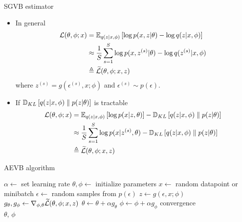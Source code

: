 \documentclass[unicode,11pt]{beamer}
\begin{document}
\begin{frame}{SGVB estimator}
  \begin{itemize}
  \item In general
    \begin{align*}
      \mathcal{L}(\theta, \phi; x)
      &= \E{q(z|x, \phi)}{\log p(x, z|\theta) - \log q(z|x, \phi)} \\
      &\approx \frac{1}{S} \sum\limits_{s = 1}^S
            \log p(x, z^{(s)}|\theta) - \log q(z^{(s)}|x, \phi) \\
      &\triangleq \widetilde{\mathcal{L}}(\theta, \phi; x, z)
    \end{align*}
    where $z^{(s)} = g(\epsilon^{(s)}, x; \phi)$ and $\epsilon^{(s)} \sim p(\epsilon)$.
  \item If $\mathbb{D}_{KL}\left[ q(z|x, \phi) \parallel p(z|\theta) \right]$ is tractable
    \begin{align*}
      \mathcal{L}(\theta, \phi; x)
      &= \E{q(z|x, \phi)}{\log p(x|z, \theta)} - \KL{q(z|x, \phi)}{p(z|\theta)} \\
      &\approx \frac{1}{S} \sum\limits_{s = 1}^S \log p(x|z^{(s)}, \theta)
       - \KL{q(z|x, \phi)}{p(z|\theta)} \\
      &\triangleq \widetilde{\mathcal{L}}(\theta, \phi; x, z)
    \end{align*}
  \end{itemize}
\end{frame}


\begin{frame}{AEVB algorithm \cite{kingma2013auto}}
  \centering
  \begin{algorithmic}
    \State $\alpha \gets$ set learning rate
    \State $\theta, \phi \gets$ initialize parameters
    \Repeat
       \State $x \gets$ random datapoint or minibatch
       \State $\epsilon \gets$ random samples from $p(\epsilon)$
       \State $z \gets g(\epsilon, x; \phi)$
       \State $g_\theta, g_\phi \gets \grad_{\phi, \theta} %
           \mathcal{\widetilde{L}}(\theta, \phi; x, z)$
       \State $\theta \gets \theta + \alpha g_\theta$
       \State $\phi \gets \phi + \alpha g_\phi$
    \Until convergence \\
    \Return $\theta$, $\phi$
  \end{algorithmic}
\end{frame}
\end{document}
